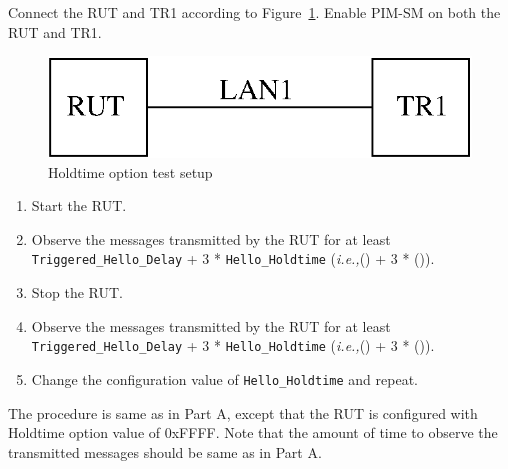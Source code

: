 \documentclass[11pt]{report}
\newcommand{\ie}{\emph{i.e.,}\xspace}
\begin{document}
Connect the RUT and TR1 according to Figure~\ref{fig:pim_test_2_4_holdtime_option}.
Enable PIM-SM on both the RUT and TR1.

\begin{figure}[htbp]
  \begin{center}
    \includegraphics[scale=0.8]{figs/pim_test_2_4_holdtime_option}
    \caption{Holdtime option test setup}
    \label{fig:pim_test_2_4_holdtime_option}
  \end{center}
\end{figure}



\begin{enumerate}

  \item Start the RUT.

  \item Observe the messages transmitted by the RUT for at least
        \verb=Triggered_Hello_Delay= + 3 * \verb=Hello_Holdtime=
        (\ie ({\PimsmTriggeredHelloDelay}) + 3 * ({\PimsmHelloHoldtime})).

  \item Stop the RUT.

  \item Observe the messages transmitted by the RUT for at least
        \verb=Triggered_Hello_Delay= + 3 * \verb=Hello_Holdtime=
        (\ie ({\PimsmTriggeredHelloDelay}) + 3 * ({\PimsmHelloHoldtime})).

  \item Change the configuration value of \verb=Hello_Holdtime= and repeat.

\end{enumerate}


The procedure is same as in Part A, except that the RUT is configured with
Holdtime option value of 0xFFFF. Note that the amount of time to observe the
transmitted messages should be same as in Part A.
\end{document}
